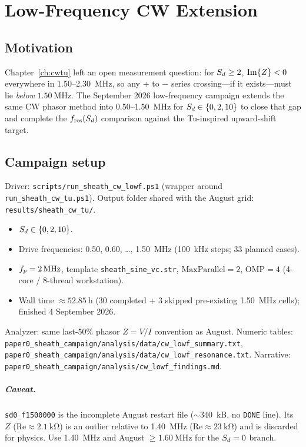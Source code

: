 \chapter{Low-Frequency CW Extension}
\label{ch:lowf}

\section{Motivation}

Chapter~\ref{ch:cwtu} left an open measurement question: for \(S_d\ge 2\), \(\operatorname{Im}\{Z\}<0\) everywhere in 1.50--2.30~MHz, so any \(+\) to \(-\) series crossing---if it exists---must lie \emph{below} \(\SI{1.50}{\mega\hertz}\). The September 2026 low-frequency campaign extends the same CW phasor method into 0.50--1.50~MHz for \(S_d\in\{0,2,10\}\) to close that gap and complete the \(f_{\mathrm{res}}(S_d)\) comparison against the Tu-inspired upward-shift target.

\section{Campaign setup}

Driver: \texttt{scripts/run\_sheath\_cw\_lowf.ps1} (wrapper around \texttt{run\_sheath\_cw\_tu.ps1}). Output folder shared with the August grid: \texttt{results/sheath\_cw\_tu/}.

\begin{itemize}[leftmargin=1.5em]
\item \(S_d\in\{0,2,10\}\).
\item Drive frequencies: 0.50, 0.60, \ldots, 1.50~MHz (100~kHz steps; 33 planned cases).
\item \(f_p=\SI{2}{\mega\hertz}\), template \texttt{sheath\_sine\_vc.str}, \(\mathrm{MaxParallel}=2\), \(\mathrm{OMP}=4\) (4-core / 8-thread workstation).
\item Wall time \(\approx\SI{52.85}{\hour}\) (30 completed + 3 skipped pre-existing 1.50~MHz cells); finished 4 September 2026.
\end{itemize}

Analyzer: same last-50\% phasor \(Z=V/I\) convention as August. Numeric tables: \texttt{paper0_sheath_campaign/analysis/data/cw\_lowf\_summary.txt}, \texttt{paper0_sheath_campaign/analysis/data/cw\_lowf\_resonance.txt}. Narrative: \texttt{paper0_sheath_campaign/analysis/cw\_lowf\_findings.md}.

\paragraph{Caveat.}
\texttt{sd0\_f1500000} is the incomplete August restart file (\(\sim\)340~kB, no \texttt{DONE} line). Its \(Z\) (Re\(\approx\SI{2.1}{\kilo\ohm}\)) is an outlier relative to 1.40~MHz (Re\(\approx\SI{23}{\kilo\ohm}\)) and is discarded for physics. Use 1.40~MHz and August \(\ge\SI{1.60}{\mega\hertz}\) for the \(S_d=0\) branch.

